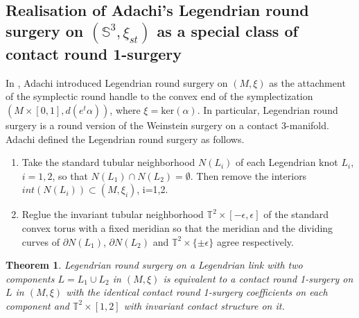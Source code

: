 \documentclass{amsart}
\theoremstyle{plain}
\newtheorem{thm}{Theorem}
\theoremstyle{remark}
\theoremstyle{definition}
\newcommand{\s}{\mathbb{S}}
\newcommand{\dd}{\partial}
\begin{document}
\subsection{Realisation of Adachi's Legendrian round surgery on $\left(\s^3, \xi_{st}\right)$ as a special class of contact round 1-surgery}
In \cite{Jiro}, Adachi introduced Legendrian round surgery on $(M, \xi)$ as the attachment of the symplectic round handle to the convex end of the symplectization $(M\times [0,1], d(e^t\alpha))$, where $\xi=\text{ker}(\alpha)$. 
In particular, Legendrian round surgery is a round version of the Weinstein surgery on a contact 3-manifold. 
Adachi defined the Legendrian round surgery as follows. 
\begin{enumerate}
    \item Take the standard tubular neighborhood $N(L_i)$ of each Legendrian knot $L_i$, $i=1,2$, so that $N(L_1) \cap N(L_2)= \emptyset$. 
    Then remove the interiors $int(N(L_i))\subset(M, \xi_i)$, i=1,2. 
    \item Reglue the invariant tubular neighborhood $\mathbb{T}^2 \times [-\epsilon, \epsilon]$ of the standard convex torus with a fixed meridian so that the meridian and the dividing curves of $\dd N(L_1)$, $\dd N(L_2)$ and $\mathbb{T}^2 \times \{\pm \epsilon\}$ agree respectively. 
\end{enumerate}

\begin{thm}\label{thm: JCR1StoCR1S}
Legendrian round surgery on a Legendrian link with two components $L= L_1\cup L_2$ in $(M, \xi)$ is equivalent to a contact round 1-surgery on $L$ in $(M, \xi)$ with the identical contact round 1-surgery coefficients on each component and $\mathbb{T}^2 \times [1,2]$ with invariant contact structure on it.  
\end{thm}
\end{document}
